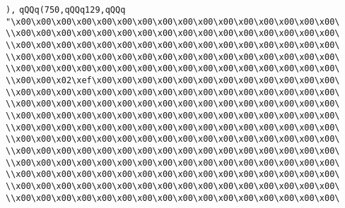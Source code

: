 \verb|),|\newline
\verb|qQQq(750,qQQq129,qQQq|\newline
\verb|"\x00\x00\x00\x00\x00\x00\x00\x00\x00\x00\x00\x00\x00\x00\x00\x00\|\newline
\verb|\\x00\x00\x00\x00\x00\x00\x00\x00\x00\x00\x00\x00\x00\x00\x00\x00\|\newline
\verb|\\x00\x00\x00\x00\x00\x00\x00\x00\x00\x00\x00\x00\x00\x00\x00\x00\|\newline
\verb|\\x00\x00\x00\x00\x00\x00\x00\x00\x00\x00\x00\x00\x00\x00\x00\x00\|\newline
\verb|\\x00\x00\x00\x00\x00\x00\x00\x00\x00\x00\x00\x00\x00\x00\x00\x00\|\newline
\verb|\\x00\x00\x02\xef\x00\x00\x00\x00\x00\x00\x00\x00\x00\x00\x00\x00\|\newline
\verb|\\x00\x00\x00\x00\x00\x00\x00\x00\x00\x00\x00\x00\x00\x00\x00\x00\|\newline
\verb|\\x00\x00\x00\x00\x00\x00\x00\x00\x00\x00\x00\x00\x00\x00\x00\x00\|\newline
\verb|\\x00\x00\x00\x00\x00\x00\x00\x00\x00\x00\x00\x00\x00\x00\x00\x00\|\newline
\verb|\\x00\x00\x00\x00\x00\x00\x00\x00\x00\x00\x00\x00\x00\x00\x00\x00\|\newline
\verb|\\x00\x00\x00\x00\x00\x00\x00\x00\x00\x00\x00\x00\x00\x00\x00\x00\|\newline
\verb|\\x00\x00\x00\x00\x00\x00\x00\x00\x00\x00\x00\x00\x00\x00\x00\x00\|\newline
\verb|\\x00\x00\x00\x00\x00\x00\x00\x00\x00\x00\x00\x00\x00\x00\x00\x00\|\newline
\verb|\\x00\x00\x00\x00\x00\x00\x00\x00\x00\x00\x00\x00\x00\x00\x00\x00\|\newline
\verb|\\x00\x00\x00\x00\x00\x00\x00\x00\x00\x00\x00\x00\x00\x00\x00\x00\|\newline
\verb|\\x00\x00\x00\x00\x00\x00\x00\x00\x00\x00\x00\x00\x00\x00\x00\x00\|\newline
